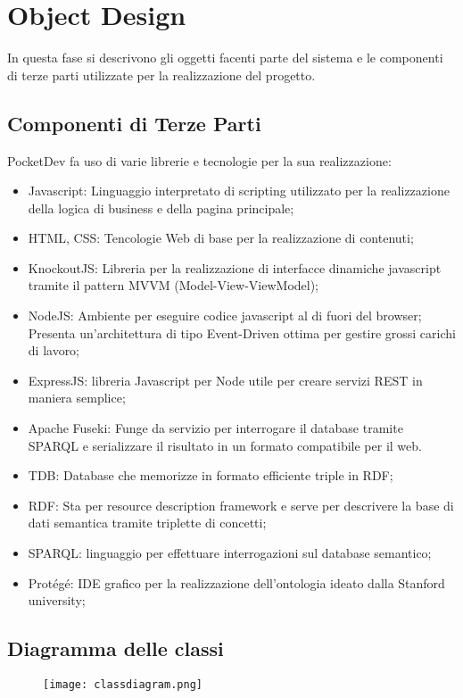\section{Object Design}
In questa fase si descrivono gli oggetti facenti parte del sistema e le componenti di terze parti utilizzate per la realizzazione del progetto.
\subsection{Componenti di Terze Parti}
PocketDev fa uso di varie librerie e tecnologie per la sua realizzazione:
\begin{itemize}
 \item Javascript: Linguaggio interpretato di scripting utilizzato per la realizzazione della logica di business e della pagina principale;
 \item HTML, CSS: Tencologie Web di base per la realizzazione di contenuti;
 \item KnockoutJS: Libreria per la realizzazione di interfacce dinamiche javascript tramite il pattern MVVM (Model-View-ViewModel);
 \item NodeJS: Ambiente per eseguire codice javascript al di fuori del browser; Presenta un'architettura di tipo Event-Driven ottima per gestire grossi carichi di lavoro;
 \item ExpressJS: libreria Javascript per Node utile per creare servizi REST in maniera semplice;
 \item Apache Fuseki: Funge da servizio per interrogare il database tramite SPARQL e serializzare il risultato in un formato compatibile per il web.
 \item TDB: Database che memorizze in formato efficiente triple in RDF;
 \item RDF: Sta per resource description framework e serve per descrivere la base di dati semantica tramite triplette di concetti;
 \item SPARQL: linguaggio per effettuare interrogazioni sul database semantico;
 \item Protégé: IDE grafico per la realizzazione dell'ontologia ideato dalla Stanford university;
\end{itemize}
\subsection{Diagramma delle classi}
\begin{figure}[H]
 \texttt{[image: classdiagram.png]}
\end{figure}
